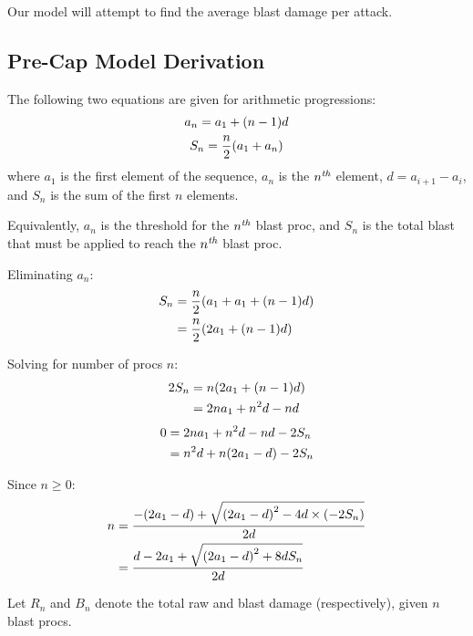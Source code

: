 \documentclass{article}
\begin{document}
Our model will attempt to find the average blast damage per attack.


\subsection{Pre-Cap Model Derivation}%
\label{sub:pre_cap_model_derivation}

The following two equations are given for arithmetic progressions:
\begin{gather}
    a_n = a_1 + \parens*{n - 1} d
        \label{eq:arithmetic_progression_element}
    \\
    S_n = \frac{n}{2} \parens*{a_1 + a_n}
        \label{eq:arithmetic_progression_sum}
\end{gather}
where $a_1$ is the first element of the sequence, $a_n$ is the ${n}^\textit{th}$ element, $d = a_{i+1} - a_{i}$, and $S_n$ is the sum of the first $n$ elements.

Equivalently, $a_n$ is the threshold for the ${n}^\textit{th}$ blast proc, and $S_n$ is the total blast that must be applied to reach the ${n}^\textit{th}$ blast proc.

Eliminating $a_n$:
\begin{align}
    S_n &= \frac{n}{2} \parens*{a_1 + a_1 + \parens*{n - 1} d} \\
        &= \frac{n}{2} \parens*{2 a_1 + \parens*{n - 1} d}
\end{align}

Solving for number of procs $n$:
\begin{align}
    2 S_n &= n \parens*{2 a_1 + \parens*{n - 1} d} \\
          &= 2 n a_1 + n^2 d - n d
\end{align}
\begin{align}
    0 &= 2 n a_1 + n^2 d - n d - 2 S_n \\
      &= n^2 d + n \parens*{2 a_1 - d} - 2 S_n
\end{align}

Since $n \ge 0$:
\begin{align}
    n &= \frac{- \parens*{2 a_1 - d} + \sqrt{\parens*{2 a_1 - d}^2 - 4 d \times \parens*{- 2 S_n}}}{2 d} \\
      &= \frac{d - 2 a_1 + \sqrt{\parens*{2 a_1 - d}^2 + 8 d S_n}}{2 d}
    \label{eq:continuous_num_procs}
\end{align}

Let $R_n$ and $B_n$ denote the total raw and blast damage (respectively), given $n$ blast procs.
\end{document}

